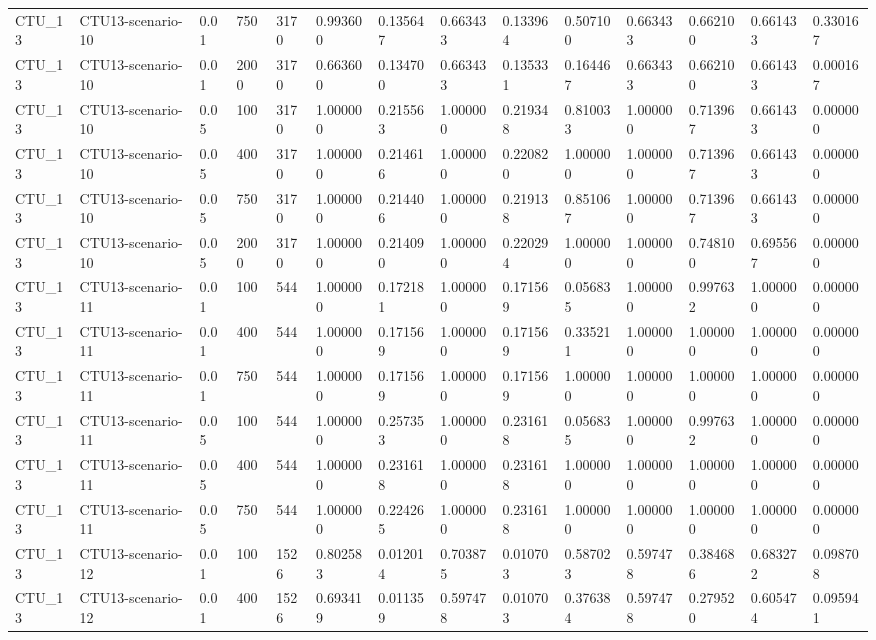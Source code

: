 \begin{tabular}{llllllllllllll}
CTU\_13 & CTU13-scenario-10 & 0.01 & 750 & 3170 & 0.993600 & 0.135647 & 0.663433 & 0.133964 & 0.507100 & 0.663433 & 0.662100 & 0.661433 & 0.330167 \\
CTU\_13 & CTU13-scenario-10 & 0.01 & 2000 & 3170 & 0.663600 & 0.134700 & 0.663433 & 0.135331 & 0.164467 & 0.663433 & 0.662100 & 0.661433 & 0.000167 \\
CTU\_13 & CTU13-scenario-10 & 0.05 & 100 & 3170 & 1.000000 & 0.215563 & 1.000000 & 0.219348 & 0.810033 & 1.000000 & 0.713967 & 0.661433 & 0.000000 \\
CTU\_13 & CTU13-scenario-10 & 0.05 & 400 & 3170 & 1.000000 & 0.214616 & 1.000000 & 0.220820 & 1.000000 & 1.000000 & 0.713967 & 0.661433 & 0.000000 \\
CTU\_13 & CTU13-scenario-10 & 0.05 & 750 & 3170 & 1.000000 & 0.214406 & 1.000000 & 0.219138 & 0.851067 & 1.000000 & 0.713967 & 0.661433 & 0.000000 \\
CTU\_13 & CTU13-scenario-10 & 0.05 & 2000 & 3170 & 1.000000 & 0.214090 & 1.000000 & 0.220294 & 1.000000 & 1.000000 & 0.748100 & 0.695567 & 0.000000 \\
CTU\_13 & CTU13-scenario-11 & 0.01 & 100 & 544 & 1.000000 & 0.172181 & 1.000000 & 0.171569 & 0.056835 & 1.000000 & 0.997632 & 1.000000 & 0.000000 \\
CTU\_13 & CTU13-scenario-11 & 0.01 & 400 & 544 & 1.000000 & 0.171569 & 1.000000 & 0.171569 & 0.335211 & 1.000000 & 1.000000 & 1.000000 & 0.000000 \\
CTU\_13 & CTU13-scenario-11 & 0.01 & 750 & 544 & 1.000000 & 0.171569 & 1.000000 & 0.171569 & 1.000000 & 1.000000 & 1.000000 & 1.000000 & 0.000000 \\
CTU\_13 & CTU13-scenario-11 & 0.05 & 100 & 544 & 1.000000 & 0.257353 & 1.000000 & 0.231618 & 0.056835 & 1.000000 & 0.997632 & 1.000000 & 0.000000 \\
CTU\_13 & CTU13-scenario-11 & 0.05 & 400 & 544 & 1.000000 & 0.231618 & 1.000000 & 0.231618 & 1.000000 & 1.000000 & 1.000000 & 1.000000 & 0.000000 \\
CTU\_13 & CTU13-scenario-11 & 0.05 & 750 & 544 & 1.000000 & 0.224265 & 1.000000 & 0.231618 & 1.000000 & 1.000000 & 1.000000 & 1.000000 & 0.000000 \\
CTU\_13 & CTU13-scenario-12 & 0.01 & 100 & 1526 & 0.802583 & 0.012014 & 0.703875 & 0.010703 & 0.587023 & 0.597478 & 0.384686 & 0.683272 & 0.098708 \\
CTU\_13 & CTU13-scenario-12 & 0.01 & 400 & 1526 & 0.693419 & 0.011359 & 0.597478 & 0.010703 & 0.376384 & 0.597478 & 0.279520 & 0.605474 & 0.095941 \\

\end{tabular}
